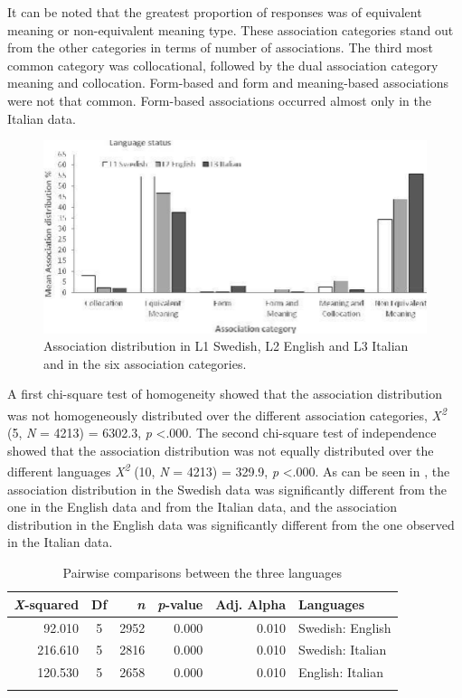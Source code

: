\documentclass[output=paper,colorlinks,citecolor=brown,nonflat]{langsci/langscibook}
\begin{document}
It can be noted that the greatest proportion of responses was of equivalent meaning or non-equivalent meaning type. These association categories stand out from the other categories in terms of number of associations. The third most common category was collocational, followed by the dual association category meaning and collocation. Form-based and form and meaning-based associations were not that common. Form-based associations occurred almost only in the Italian data.

\begin{figure}
    \includegraphics[width=\textwidth]{figures/Gudmundson-fig2.pdf}
    \caption{Association distribution in L1 Swedish, L2 English and L3 Italian and in the six association categories.}
    \label{fig:gudmundson:2}
\end{figure}

A first chi-square test of homogeneity showed that the association distribution was not homogeneously distributed over the different association categories, \textit{X\textsuperscript{2}} (5, \textit{N} = 4213) = 6302.3, \textit{p} <.000. The second chi-square test of independence showed that the association distribution was not equally distributed over the different languages \textit{X\textsuperscript{2}} (10, \textit{N} = 4213) = 329.9, \textit{p} <.000. As can be seen in , the association distribution in the Swedish data was significantly different from the one in the English data and from the Italian data, and the association distribution in the English data was significantly different from the one observed in the Italian data.

\begin{table}
    \begin{tabular}{rcrrrl}
    \lsptoprule
         \textit{X}{}-squared & Df & \textit{n} & \textit{p}{}-value & Adj. Alpha & Languages\\
    \midrule
        92.010 & 5 & 2952 & 0.000 & 0.010 & Swedish: English\\
        216.610 & 5 & 2816 & 0.000 & 0.010 & Swedish: Italian\\
        120.530 & 5 & 2658 & 0.000 & 0.010 & English: Italian\\
    \lspbottomrule
    \end{tabular}
    \caption{Pairwise comparisons between the three languages}
    \label{tab:gudmundson:3}
\end{table}
\end{document}
